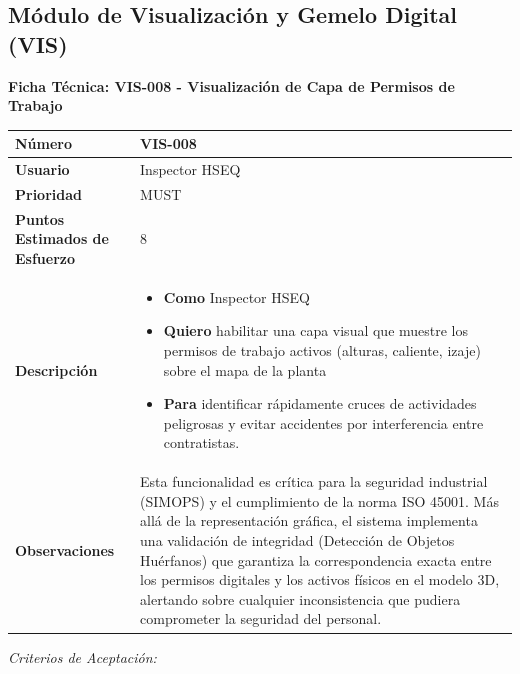 \subsection{Módulo de Visualización y Gemelo Digital (VIS)}
\noindent\textbf{Ficha Técnica: VIS-008 - Visualización de Capa de Permisos de Trabajo}
\footnotesize\setlength{\tabcolsep}{4pt}\renewcommand{\arraystretch}{1.2}
\begin{longtable}{|p{0.21\textwidth}|p{0.74\textwidth}|}\hline
\textbf{Número} & VIS-008 \\ \hline
\textbf{Usuario} & Inspector HSEQ \\ \hline
\textbf{Prioridad} & MUST \\ \hline
\textbf{Puntos Estimados de Esfuerzo} & 8 \\ \hline
\textbf{Descripción} & \parbox[t]{\linewidth}{\vspace{2pt}\begin{itemize}[leftmargin=1.5em, nosep, topsep=0pt]
\item \textbf{Como} Inspector HSEQ
\item \textbf{Quiero} habilitar una capa visual que muestre los permisos de trabajo activos (alturas, caliente, izaje) sobre el mapa de la planta
\item \textbf{Para} identificar rápidamente cruces de actividades peligrosas y evitar accidentes por interferencia entre contratistas.
\end{itemize}\vspace{2pt}} \\ \hline
\textbf{Observaciones} & Esta funcionalidad es crítica para la seguridad industrial (SIMOPS) y el cumplimiento de la norma ISO 45001. Más allá de la representación gráfica, el sistema implementa una validación de integridad (Detección de Objetos Huérfanos) que garantiza la correspondencia exacta entre los permisos digitales y los activos físicos en el modelo 3D, alertando sobre cualquier inconsistencia que pudiera comprometer la seguridad del personal. \\ \hline
\end{longtable}\normalsize
\noindent\textit{Criterios de Aceptación:}
